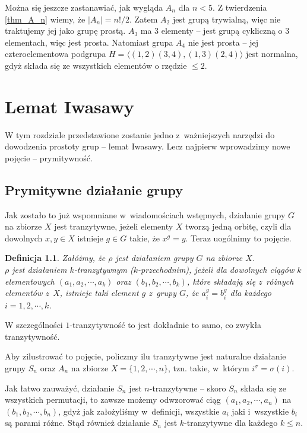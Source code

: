 \documentclass[licencjacka]{pracamgr}
\newtheorem{deff}{Definicja}[section]
\begin{document}
Można się jeszcze zastanawiać, jak wygląda $A_n$ dla $n < 5$.
Z twierdzenia \ref{thm_A_n} wiemy, że $|A_n| = n!/2$.
Zatem $A_2$ jest grupą trywialną, więc nie traktujemy jej jako grupę prostą.
$A_3$ ma 3 elementy -- jest grupą cykliczną o 3 elementach, więc jest prosta.
Natomiast grupa $A_4$ nie jest prosta -- jej czteroelementowa podgrupa 
$H = \langle (1,2)(3,4), (1,3)(2,4) \rangle$ jest normalna, gdyż składa się ze wszystkich elementów o rzędzie $\le 2$.



\chapter{Lemat Iwasawy}
W tym rozdziale przedstawione zostanie jedno z~ważniejszych narzędzi do dowodzenia prostoty grup -- lemat Iwasawy.
Lecz najpierw wprowadzimy nowe pojęcie --  prymitywność.

\section{Prymitywne działanie grupy}
Jak zostało to już wspomniane w~wiadomościach wstępnych, działanie grupy $G$ na zbiorze $X$ jest tranzytywne, 
jeżeli elementy $X$ tworzą jedną orbitę, czyli dla dowolnych $x, y \in X$ istnieje $g \in G$ takie, że $x^g = y$.
Teraz uogólnimy to pojęcie.

\begin{deff}
	Załóżmy, że $\rho$ jest działaniem grupy $G$ na zbiorze $X$. \\
	$\rho$ jest \emph{działaniem $k$-tranzytywnym ($k$-przechodnim)}, 
	jeżeli dla dowolnych ciągów $k$ elementowych $(a_1, a_2, \cdots, a_k)$ oraz $(b_1, b_2, \cdots, b_k)$, 
	które składają się z~różnych elementów z~$X$, istnieje taki element $g$ z~grupy $G$, że
	$a_i^g = b_i^g$ dla każdego $i = 1, 2, \cdots, k$.
\end{deff}
W szczególności $1$-tranzytywność to jest dokładnie to samo, co zwykła tranzytywność.

Aby zilustrować to pojęcie, policzmy ilu tranzytywne jest naturalne działanie grupy $S_n$ oraz $A_n$ na zbiorze $X = \{1, 2, \cdots, n\}$,
tzn. takie, w~którym $i^\sigma = \sigma(i)$.

Jak łatwo zauważyć, działanie $S_n$ jest $n$-tranzytywne -- skoro $S_n$ składa się ze wszystkich permutacji, 
to zawsze możemy odwzorować ciąg $(a_1, a_2, \cdots, a_n)$ na $(b_1, b_2, \cdots, b_n)$, gdyż jak założyliśmy w~definicji, 
wszystkie $a_i$ jaki i~wszystkie $b_i$ są parami różne.
Stąd również działanie $S_n$ jest $k$-tranzytywne dla każdego $k \le n$.
\end{document}
